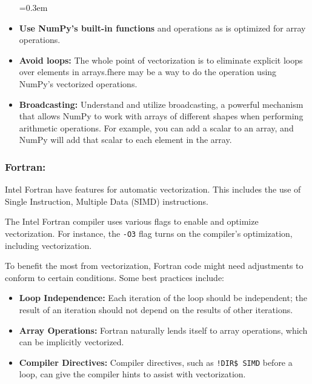 \begin{itemize}[label={\scriptsize\raisebox{0.5ex}{\textbullet}}]

\itemsep=0.3em\topsep=0pt\partopsep=0pt
\parskip=0pt\parsep=0pt


 \item \textbf{Use NumPy's built-in functions} and operations as is optimized for array operations.

 \item \textbf{Avoid loops:} The whole point of vectorization is to eliminate explicit loops over elements in arrays.fhere may be a way to do the operation using NumPy's vectorized operations.

 \item \textbf{Broadcasting:} Understand and utilize broadcasting, a powerful mechanism that allows NumPy to work with arrays of different shapes when performing arithmetic operations. For example, you can add a scalar to an array, and NumPy will add that scalar to each element in the array.
 
\end{itemize}


\subsubsection*{Fortran:}

Intel Fortran have features for automatic vectorization. This includes the use of Single Instruction, Multiple Data (SIMD) instructions.

The Intel Fortran compiler uses various flags to enable and optimize vectorization. For instance, the \texttt{-O3} flag turns on the compiler's optimization, including vectorization.

To benefit the most from vectorization, Fortran code might need adjustments to conform to certain conditions. Some best practices include:

\begin{itemize}
\item \textbf{Loop Independence:} Each iteration of the loop should be independent; the result of an iteration should not depend on the results of other iterations.
\item \textbf{Array Operations:} Fortran naturally lends itself to array operations, which can be implicitly vectorized.
\item \textbf{Compiler Directives:} Compiler directives, such as \texttt{!DIR\$ SIMD} before a loop, can give the compiler hints to assist with vectorization.
\end{itemize}



